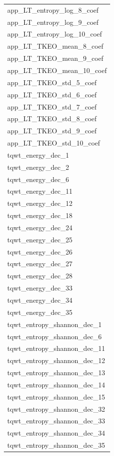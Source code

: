 \documentclass[
]{article}
\begin{document}
\begin{table}
\begin{tabular}{l}
app\_LT\_entropy\_log\_8\_coef\\
app\_LT\_entropy\_log\_9\_coef\\
app\_LT\_entropy\_log\_10\_coef\\
app\_LT\_TKEO\_mean\_8\_coef\\
\addlinespace
app\_LT\_TKEO\_mean\_9\_coef\\
app\_LT\_TKEO\_mean\_10\_coef\\
app\_LT\_TKEO\_std\_5\_coef\\
app\_LT\_TKEO\_std\_6\_coef\\
app\_LT\_TKEO\_std\_7\_coef\\
\addlinespace
app\_LT\_TKEO\_std\_8\_coef\\
app\_LT\_TKEO\_std\_9\_coef\\
app\_LT\_TKEO\_std\_10\_coef\\
tqwt\_energy\_dec\_1\\
tqwt\_energy\_dec\_2\\
\addlinespace
tqwt\_energy\_dec\_6\\
tqwt\_energy\_dec\_11\\
tqwt\_energy\_dec\_12\\
tqwt\_energy\_dec\_18\\
tqwt\_energy\_dec\_24\\
\addlinespace
tqwt\_energy\_dec\_25\\
tqwt\_energy\_dec\_26\\
tqwt\_energy\_dec\_27\\
tqwt\_energy\_dec\_28\\
tqwt\_energy\_dec\_33\\
\addlinespace
tqwt\_energy\_dec\_34\\
tqwt\_energy\_dec\_35\\
tqwt\_entropy\_shannon\_dec\_1\\
tqwt\_entropy\_shannon\_dec\_6\\
tqwt\_entropy\_shannon\_dec\_11\\
\addlinespace
tqwt\_entropy\_shannon\_dec\_12\\
tqwt\_entropy\_shannon\_dec\_13\\
tqwt\_entropy\_shannon\_dec\_14\\
tqwt\_entropy\_shannon\_dec\_15\\
tqwt\_entropy\_shannon\_dec\_32\\
\addlinespace
tqwt\_entropy\_shannon\_dec\_33\\
tqwt\_entropy\_shannon\_dec\_34\\
tqwt\_entropy\_shannon\_dec\_35\\

\end{tabular}
\end{table}
\end{document}

